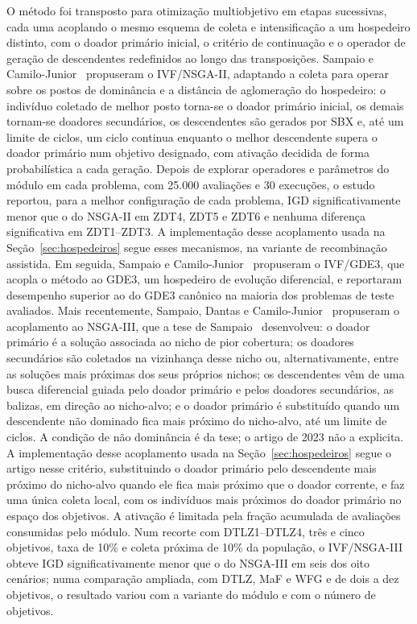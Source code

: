 O método foi transposto para otimização multiobjetivo em etapas sucessivas, cada uma acoplando o mesmo esquema de coleta e intensificação a um hospedeiro distinto, com o doador primário inicial, o critério de continuação e o operador de geração de descendentes redefinidos ao longo das transposições. Sampaio e Camilo-Junior~\cite{sampaio2017ivf} propuseram o IVF/NSGA-II, adaptando a coleta para operar sobre os postos de dominância e a distância de aglomeração do hospedeiro: o indivíduo coletado de melhor posto torna-se o doador primário inicial, os demais tornam-se doadores secundários, os descendentes são gerados por SBX e, até um limite de ciclos, um ciclo continua enquanto o melhor descendente supera o doador primário num objetivo designado, com ativação decidida de forma probabilística a cada geração. Depois de explorar operadores e parâmetros do módulo em cada problema, com 25.000 avaliações e 30 execuções, o estudo reportou, para a melhor configuração de cada problema, IGD significativamente menor que o do NSGA-II em ZDT4, ZDT5 e ZDT6 e nenhuma diferença significativa em ZDT1--ZDT3. A implementação desse acoplamento usada na Seção~\ref{sec:hospedeiros} segue esses mecanismos, na variante de recombinação assistida. Em seguida, Sampaio e Camilo-Junior~\cite{sampaio2019ivf} propuseram o IVF/GDE3, que acopla o método ao GDE3, um hospedeiro de evolução diferencial, e reportaram desempenho superior ao do GDE3 canônico na maioria dos problemas de teste avaliados. Mais recentemente, Sampaio, Dantas e Camilo-Junior~\cite{sampaio2023ivf} propuseram o acoplamento ao NSGA-III, que a tese de Sampaio~\cite{Sampaio2024} desenvolveu: o doador primário é a solução associada ao nicho de pior cobertura; os doadores secundários são coletados na vizinhança desse nicho ou, alternativamente, entre as soluções mais próximas dos seus próprios nichos; os descendentes vêm de uma busca diferencial guiada pelo doador primário e pelos doadores secundários, as balizas, em direção ao nicho-alvo; e o doador primário é substituído quando um descendente não dominado fica mais próximo do nicho-alvo, até um limite de ciclos. A condição de não dominância é da tese; o artigo de 2023 não a explicita. A implementação desse acoplamento usada na Seção~\ref{sec:hospedeiros} segue o artigo nesse critério, substituindo o doador primário pelo descendente mais próximo do nicho-alvo quando ele fica mais próximo que o doador corrente, e faz uma única coleta local, com os indivíduos mais próximos do doador primário no espaço dos objetivos. A ativação é limitada pela fração acumulada de avaliações consumidas pelo módulo. Num recorte com DTLZ1--DTLZ4, três e cinco objetivos, taxa de 10\% e coleta próxima de 10\% da população, o IVF/NSGA-III obteve IGD significativamente menor que o do NSGA-III em seis dos oito cenários; numa comparação ampliada, com DTLZ, MaF e WFG e de dois a dez objetivos, o resultado variou com a variante do módulo e com o número de objetivos.
